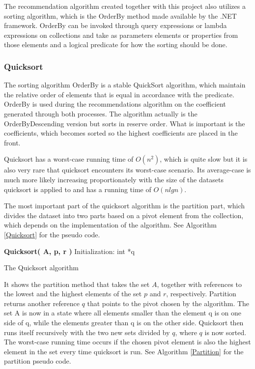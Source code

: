 The recommendation algorithm created together with this project also utilizes a sorting algorithm, which is the OrderBy method made available by the .NET framework. OrderBy can be invoked through query expressions or lambda expressions on collections and take as parameters elements or properties from those elements and a logical predicate for how the sorting should be done. \cite{AlgoAnal1}

\subsubsection{Quicksort}

The sorting algorithm OrderBy is a stable QuickSort algorithm, which maintain the relative order of elements that is equal in accordance with the predicate. OrderBy is used during the recommendations algorithm on the coefficient generated through both processes. The algorithm actually is the OrderByDescending version but sorts in reserve order. What is important is the coefficients, which becomes sorted so the highest coefficients are placed in the front.

Quicksort has a worst-case running time of $O(n^2)$, which is quite slow but it is also very rare that quicksort encounters its worst-case scenario. Its average-case is much more likely increasing proportionately with the size of the datasets quicksort is applied to and has a running time of $O(nlgn)$.

The most important part of the quicksort algorithm is the partition part, which divides the dataset into two parts based on a pivot element from the collection, which depends on the implementation of the algorithm. See Algorithm \ref{Quicksort} for the pseudo code.

\begin{algorithm}
	\DontPrintSemicolon
	\textbf{Quicksort( A, p, r )}\;
	Initialization:\;
	int *q\;
	\caption{The Quicksort algorithm}
	\label{Quicksort}
\end{algorithm}


It shows the partition method that takes the set $A$, together with references to the lowest and the highest elements of the set $p$ and $r$, respectively. Partition returns another reference $q$ that points to the pivot chosen by the algorithm. The set A is now in a state where all elements smaller than the element q is on one side of q, while the elements greater than q is on the other side. Quicksort then runs itself recursively with the two new sets divided by $q$, where $q$ is now sorted. The worst-case running time occurs if the chosen pivot element is also the highest element in the set every time quicksort is run. See Algorithm \ref{Partition} for the partition pseudo code.

